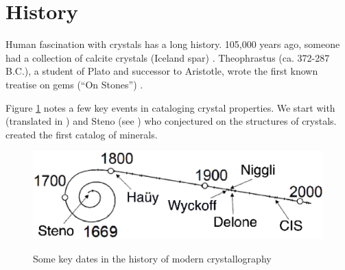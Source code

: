 \documentclass[preprint]{iucr}              %
\numberwithin{equation}{section}
\begin{document}
	\section{History}
	
	Human fascination with crystals has a long history. 105,000 years ago,
	someone had a collection of calcite crystals 
	(Iceland spar) \cite{wilkins2021innovative}. 
	Theophrastus (ca. 372-287 B.C.), a student of Plato and successor to Aristotle, wrote the first known treatise on gems (``On Stones'')  \cite{enwiki:1114534722}.
	
	Figure \ref{timeline} notes a few key events in cataloging 
	crystal properties. We start with \cite{Kepler1611} (translated in \cite{kepler1966}) and Steno  (see \cite{authier2013early}) who
	conjectured on the structures of crystals.  \cite{hauy1800addition} created the first catalog of minerals.
	
	\begin{figure}
		\includegraphics[width=\textwidth]{TimeLine_rev}
		\label{timeline}
		\caption{Some key dates in the history of modern crystallography}
	\end{figure}
	
	
\end{document}
